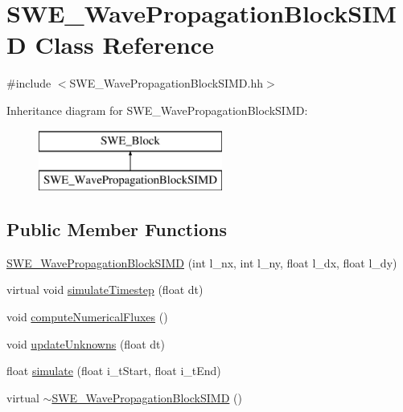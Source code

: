 \hypertarget{classSWE__WavePropagationBlockSIMD}{\section{S\-W\-E\-\_\-\-Wave\-Propagation\-Block\-S\-I\-M\-D Class Reference}
\label{classSWE__WavePropagationBlockSIMD}
}


{\ttfamily \#include $<$S\-W\-E\-\_\-\-Wave\-Propagation\-Block\-S\-I\-M\-D.\-hh$>$}

Inheritance diagram for S\-W\-E\-\_\-\-Wave\-Propagation\-Block\-S\-I\-M\-D\-:\begin{figure}[H]
\begin{center}
\leavevmode
\includegraphics[height=2.000000cm]{classSWE__WavePropagationBlockSIMD}
\end{center}
\end{figure}
\subsection*{Public Member Functions}
\begin{DoxyCompactItemize}
\item 
\hyperlink{classSWE__WavePropagationBlockSIMD_a57dc616f1aa84f33a9c75ecb116b3228}{S\-W\-E\-\_\-\-Wave\-Propagation\-Block\-S\-I\-M\-D} (int l\-\_\-nx, int l\-\_\-ny, float l\-\_\-dx, float l\-\_\-dy)
\item 
virtual void \hyperlink{classSWE__WavePropagationBlockSIMD_a99c288632c402eaf7dff76f03624872a}{simulate\-Timestep} (float dt)
\item 
void \hyperlink{classSWE__WavePropagationBlockSIMD_a4aa15050ec1db113f54fff06539a900f}{compute\-Numerical\-Fluxes} ()
\item 
void \hyperlink{classSWE__WavePropagationBlockSIMD_a2596238868efd3cdd453d9ac2de15997}{update\-Unknowns} (float dt)
\item 
float \hyperlink{classSWE__WavePropagationBlockSIMD_a6c54dbcd43a77b46bae4de36b8d16af7}{simulate} (float i\-\_\-t\-Start, float i\-\_\-t\-End)
\item 
virtual \hyperlink{classSWE__WavePropagationBlockSIMD_aee73625ee731614849f398ea392137a7}{$\sim$\-S\-W\-E\-\_\-\-Wave\-Propagation\-Block\-S\-I\-M\-D} ()
\end{DoxyCompactItemize}
